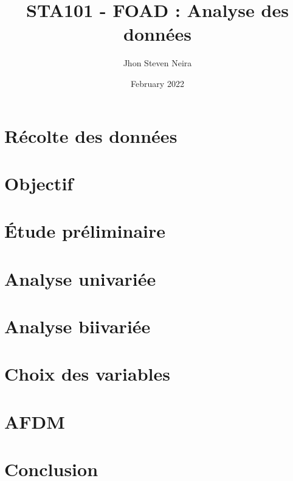 \documentclass[12pt, a4paper]{article}
\title{STA101 - FOAD : Analyse des données}
\author{Jhon Steven Neira}
\date{February 2022}
\begin{document}
  
\maketitle
  
\tableofcontents

\section{Récolte des  données }


\section{Objectif}






\section{Étude préliminaire}



\section{Analyse univariée}



\section{Analyse biivariée}


\section{Choix des variables}


\section{AFDM }


\section{Conclusion }


         
\end{document}
